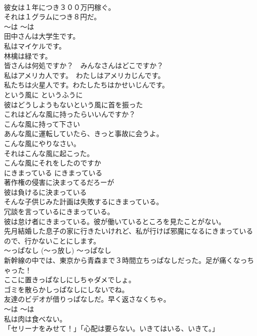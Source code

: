 \documentclass[8pt]{extreport}
\begin{document}
\begin{CJK}{UTF8}{min}
\\	彼女は１年につき３００万円稼ぐ。   
\\	それは１グラムにつき８円だ。   
\\	〜は	〜は	
\\	田中さんは大学生です。
\\	私はマイケルです。  
\\	林檎は緑です。
\\	皆さんは何処ですか？　みんなさんはどこですか？   
\\	私はアメリカ人です。　わたしはアメリカじんです。   
\\	私たちは火星人です。わたしたちはかせいじんです。   
\\	という風に	というふうに	
\\	彼はどうしようもないという風に首を振った  
\\	これはどんな風に持ったらいいんですか？  
\\	こんな風に持って下さい  
\\	あんな風に運転していたら、きっと事故に会うよ。  
\\	こんな風にやりなさい。  
\\	それはこんな風に起こった。  
\\	こんな風にそれをしたのですか  
\\	にきまっている	にきまっている	
\\	著作権の侵害に決まってるだろーが  
\\	彼は負けるに決まっている  
\\	そんな子供じみた計画は失敗するにきまっている。   
\\	冗談を言っているにきまっている。   
\\	彼は怠け者にきまっている。彼が働いているところを見たことがない。   
\\	先月結婚した息子の家に行きたいけれど、私が行けば邪魔になるにきまっているので、行かないことにします。  
\\	〜っぱなし (〜っ放し)	〜っぱなし	
\\	新幹線の中では、東京から青森まで３時間立ちっぱなしだった。足が痛くなっちゃった！  
\\	ここに置きっぱなしにしちゃダメでしょ。  
\\	ゴミを散らかしっぱなしにしないでね。  
\\	友達のビデオが借りっぱなしだ。早く返さなくちゃ。  
\\	〜は	〜は	
\\	私は肉は食べない。  
\\	「セリーナをみせて！」「心配は要らない。いきてはいる、いきて。」  

\end{CJK}
\end{document}
